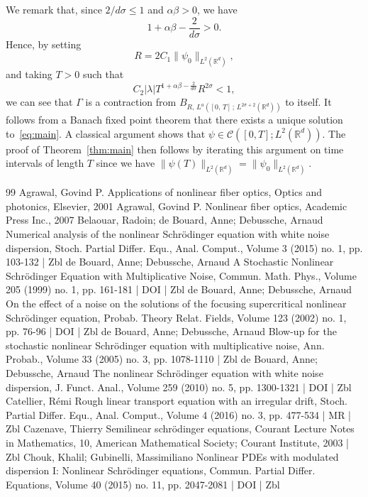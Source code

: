 \documentclass[10pt]{amsart}
\theoremstyle{definition}\newtheorem{defi}[theo]{Definition}\newtheorem{rema}[theo]{Remark}\newtheorem{exam}[theo]{Example}\newtheorem{exem}[theo]{Example}\newtheorem{nota}[theo]{Notation}
\newcommand{\bbR}{\mathbb{R}}
\newcommand{\clC}{\mathcal{C}}
\begin{document}
We remark that, since $2/d\sigma\leq 1$ and $\alpha\beta>0$, we have
\[
1+\alpha\beta-\frac{2}{d\sigma}> 0.
\]
Hence, by setting
\[
R = 2 C_1\|\psi_0\|_{L^2\left(\bbR^d\right)},
\]
and taking $T>0$ such that
\[
C_2|\lambda| T^{1+\alpha\beta-\frac{2}{d\sigma}} R^{2\sigma}< 1,
\]
we can see that $\Gamma$ is a contraction from $B_{R,\,L^{a}([0,\,T]\,;\,L^{2\sigma+2}(\bbR^d))}$ to itself. It follows from a Banach fixed point theorem that there exists a unique solution to~\eqref{eq:main}. A classical argument shows that $\psi\in\clC([0,T];L^2(\bbR^d))$. The proof of Theorem~\ref{thm:main} then follows by iterating this argument on time intervals of length $T$ since we have $\|\psi(T)\|_{L^2(\bbR^d)} = \|\psi_0\|_{L^2(\bbR^d)}$.



\begin{thebibliography}{99}
Agrawal, Govind P. Applications of nonlinear fiber optics, Optics and photonics, Elsevier, 2001
Agrawal, Govind P. Nonlinear fiber optics, Academic Press Inc., 2007
Belaouar, Radoin; de Bouard, Anne; Debussche, Arnaud Numerical analysis of the nonlinear Schrödinger equation with white noise dispersion, Stoch. Partial Differ. Equ., Anal. Comput., Volume 3 (2015) no. 1, pp. 103-132 | Zbl
de Bouard, Anne; Debussche, Arnaud A Stochastic Nonlinear Schrödinger Equation with Multiplicative Noise, Commun. Math. Phys., Volume 205 (1999) no. 1, pp. 161-181 | DOI | Zbl
de Bouard, Anne; Debussche, Arnaud On the effect of a noise on the solutions of the focusing supercritical nonlinear Schrödinger equation, Probab. Theory Relat. Fields, Volume 123 (2002) no. 1, pp. 76-96 | DOI | Zbl
de Bouard, Anne; Debussche, Arnaud Blow-up for the stochastic nonlinear Schrödinger equation with multiplicative noise, Ann. Probab., Volume 33 (2005) no. 3, pp. 1078-1110 | Zbl
de Bouard, Anne; Debussche, Arnaud The nonlinear Schrödinger equation with white noise dispersion, J. Funct. Anal., Volume 259 (2010) no. 5, pp. 1300-1321 | DOI | Zbl
Catellier, Rémi Rough linear transport equation with an irregular drift, Stoch. Partial Differ. Equ., Anal. Comput., Volume 4 (2016) no. 3, pp. 477-534 | MR | Zbl
Cazenave, Thierry Semilinear schrödinger equations, Courant Lecture Notes in Mathematics, 10, American Mathematical Society; Courant Institute, 2003 | Zbl
Chouk, Khalil; Gubinelli, Massimiliano Nonlinear PDEs with modulated dispersion I: Nonlinear Schrödinger equations, Commun. Partial Differ. Equations, Volume 40 (2015) no. 11, pp. 2047-2081 | DOI | Zbl

\end{thebibliography}
\end{document}
